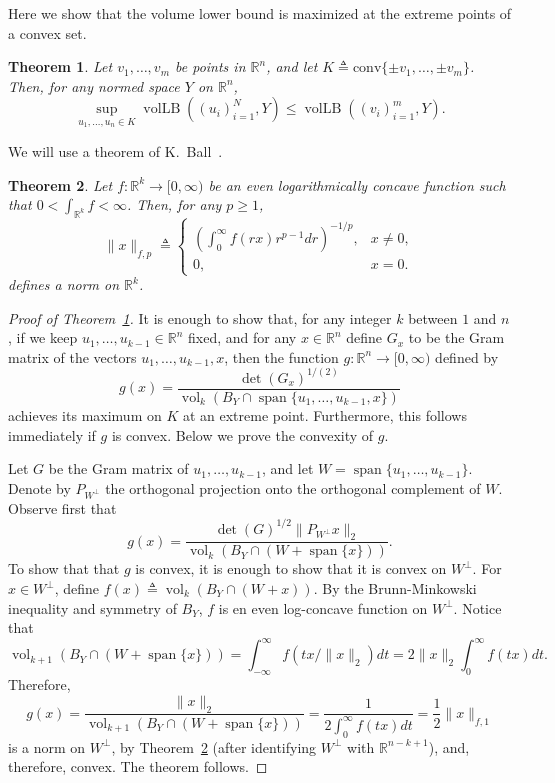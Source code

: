 \documentclass[12pt]{article}
\newtheorem{theorem}{Theorem}
\newcommand{\R}{{\mathbb{R}}}
\newcommand{\eqdef}{\triangleq}
\DeclareMathOperator{\vollb}{volLB}
\DeclareMathOperator{\vol}{vol}
\DeclareMathOperator{\lspan}{span}
\begin{document}
Here we show that the volume lower bound is maximized at the extreme
points of a convex set.

\begin{theorem}\label{thm:conv-hull}
  Let $v_1, \ldots, v_m$ be points in $\R^n$, and let $K \eqdef
  \mathrm{conv}\{\pm v_1, \ldots, \pm v_m\}$. Then, for any normed
  space $Y$ on $\R^n$, 
  \[
  \sup_{u_1, \ldots, u_n \in K}\vollb((u_i)_{i = 1}^N, Y)
  \le
  \vollb((v_i)_{i = 1}^m, Y).
  \]
\end{theorem}

We will use a theorem of K.~Ball~\cite{Ball88}.

\begin{theorem}\label{thm:ball-logconcave}
  Let $f: \R^k \to [0, \infty)$ be an even logarithmically concave
  function such that $0 < \int_{\R^k} f < \infty$. Then, for any $p
  \ge 1$, 
  \[
  \|x\|_{f,p} \eqdef 
  \begin{cases}
    \left(\int_0^\infty f(rx) r^{p-1}dr\right)^{-1/p}, &x \neq 0,\\
    0, &x = 0.
  \end{cases}
  \]
  defines a norm on $\R^k$. 
\end{theorem}


\begin{proof}[Proof of Theorem~\ref{thm:conv-hull}]
  It is enough to show that, for any integer $k$ between $1$ and $n$,
  if we keep $u_1, \ldots, u_{k-1} \in \R^n$ fixed, and for any $x\in
  \R^n$ define $G_x$ to be the Gram matrix of the vectors $u_1,
  \ldots, u_{k-1}, x$, then the function $g: \R^n \to [0, \infty)$
  defined by
  \[
  g(x) = \frac{\det(G_x)^{1/(2)}}{\vol_k(B_Y \cap \lspan\{u_1,
    \ldots, u_{k-1}, x\})}
  \]
  achieves its maximum on $K$ at an extreme point. Furthermore, this
  follows immediately if $g$ is convex. Below we prove the convexity
  of $g$.

  Let $G$ be the Gram matrix of $u_1, \ldots, u_{k-1}$, and let $W =
  \lspan\{u_1, \ldots, u_{k-1}\}$. Denote by $P_{W^\perp}$ the
  orthogonal projection onto the orthogonal complement of $W$.
  Observe first that
  \[
  g(x) = \frac{\det(G)^{1/2}\|P_{W^\perp}x\|_2}{\vol_k(B_Y \cap (W +
    \lspan\{x\}))}. 
  \]
  To show that that $g$ is convex, it is enough to show that it is
  convex on $W^\perp$.  For $x \in W^\perp$, define $f(x) \eqdef
  \vol_{k}(B_Y \cap (W + x))$. By the Brunn-Minkowski inequality and
  symmetry of $B_Y$, $f$ is en even log-concave function on
  $W^\perp$. Notice that
  \[
  \vol_{k+1}(B_Y \cap  (W + \lspan\{x\}))
  = 
  \int_{-\infty}^\infty{f(tx/\|x\|_2)dt} 
  = 
  2\|x\|_2 \int_{0}^\infty{f(tx)dt}.
  \]
  Therefore, 
  \[
  g(x) = 
  \frac{\|x\|_2}{\vol_{k+1}(B_Y \cap  (W + \lspan\{x\}))}
  = 
  \frac{1}{2\int_{0}^\infty{f(tx)dt}}
  = \frac{1}{2}\|x\|_{f,1}
  \]
  is a norm on $W^\perp$, by Theorem~\ref{thm:ball-logconcave} (after
  identifying $W^\perp$ with $\R^{n-k+1}$), and, therefore, convex. The
  theorem follows.
\end{proof}
\end{document}
